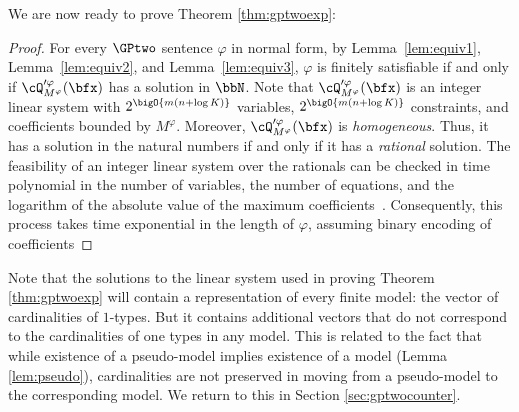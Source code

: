 We are now ready to prove Theorem \ref{thm:gptwoexp}:

\begin{proof}
    For every $\GPtwo$ sentence $\varphi$ in normal form,
    by Lemma~\ref{lem:equiv1}, Lemma~\ref{lem:equiv2}, and Lemma~\ref{lem:equiv3},
    $\varphi$ is finitely satisfiable if and only if $\cQ_{M^\varphi}'^\varphi(\bfx)$ has a solution in $\bbN$.
    Note that $\cQ_{M^\varphi}'^\varphi(\bfx)$ is an integer linear system with 
    $2^\bigO{m\left(n + \log K\right)}$ variables, 
    $2^\bigO{m\left(n + \log K\right)}$ constraints, and
    coefficients bounded by $M^\varphi$.
    Moreover, $\cQ_{M^\varphi}'^\varphi(\bfx)$ is \emph{homogeneous}. 
    Thus, it has a solution in the natural numbers if and only if it has a \emph{rational} solution.
    The feasibility of an integer linear system over the rationals can be checked in time polynomial in the number of variables, the number of equations, and the logarithm of the absolute value of the maximum coefficients~\cite{IP}. Consequently, this process takes time exponential in the length of $\varphi$, assuming binary encoding of coefficients
\end{proof}

Note that the solutions to the linear system used in proving Theorem \ref{thm:gptwoexp} will contain a representation of every finite model:  the vector of cardinalities of $1$-types. But it contains additional vectors that do not correspond to the cardinalities of one types in any model. This is related to the fact that while existence of a pseudo-model implies existence of a model (Lemma \ref{lem:pseudo}), cardinalities are not preserved in moving from a pseudo-model to the corresponding model.  We return to this in Section \ref{sec:gptwocounter}. 
